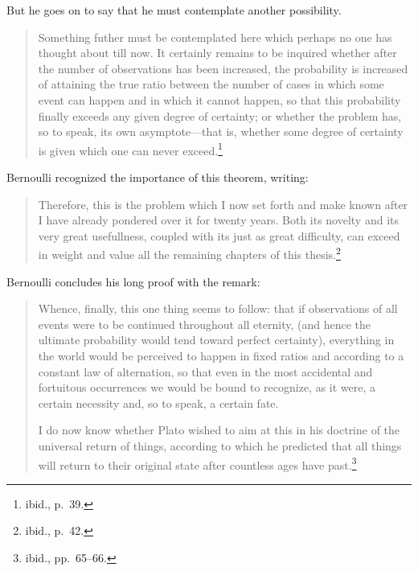 \noindent But he goes on to say that he must contemplate another possibility.

\begin{quote}
Something futher must be contemplated here which perhaps no one has thought
about till now.  It certainly remains to be inquired whether after the number
of observations has been increased, the probability is increased of attaining
the true ratio between the number of cases in which some event can happen and
in which it cannot happen, so that this probability finally exceeds any given
degree of certainty; or whether the problem has, so to speak, its own
asymptote---that is, whether some degree of certainty is given which one can
never exceed.\footnote{ibid., p.~39.}
\end{quote}

\noindent Bernoulli recognized the importance of this theorem, writing:

\begin{quote}
Therefore, this is the problem which I now set forth and make known after I
have already pondered over it for twenty years.  Both its novelty and its very
great usefullness, coupled with its just as great difficulty, can exceed in
weight and value all the remaining chapters of this thesis.\footnote{ibid.,
p.~42.}
\end{quote}

\noindent Bernoulli concludes his long proof with the remark:

\begin{quote}
Whence, finally, this one thing seems to follow: that if observations of all
events were to be continued throughout all eternity, (and hence the ultimate
probability would tend toward perfect certainty), everything in the world would
be perceived to happen in fixed ratios and according to a constant law of
alternation, so that even in the most accidental and fortuitous occurrences we
would be bound to recognize, as it were, a certain necessity and, so to speak,
a certain fate.

I do now know whether Plato wished to aim at this in his doctrine of the
universal return of things, according to which he predicted that all things
will return to their original state after countless ages have
past.\footnote{ibid., pp.~65--66.}
\end{quote}

